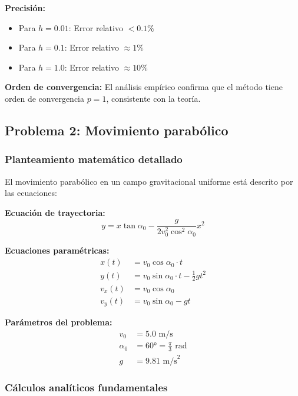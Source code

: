\documentclass{article}
\begin{document}
	\textbf{Precisión:}
	\begin{itemize}
	\item Para $h = 0.01$: Error relativo $< 0.1\%$
	\item Para $h = 0.1$: Error relativo $\approx 1\%$
	\item Para $h = 1.0$: Error relativo $\approx 10\%$
	\end{itemize}
	
	\textbf{Orden de convergencia:}
	El análisis empírico confirma que el método tiene orden de convergencia $p = 1$, consistente con la teoría.

	\clearpage

	\subsection{Problema 2: Movimiento parabólico}
	
	\subsubsection{Planteamiento matemático detallado}
	
	El movimiento parabólico en un campo gravitacional uniforme está descrito por las ecuaciones:
	
	\textbf{Ecuación de trayectoria:}
	\begin{equation}
		y = x \tan \alpha_0 - \frac{g}{2v_0^2 \cos^2 \alpha_0} x^2
		\label{eq:trayectoria}
	\end{equation}
	
	\textbf{Ecuaciones paramétricas:}
	\begin{align}
		x(t) &= v_0 \cos \alpha_0 \cdot t \\
		y(t) &= v_0 \sin \alpha_0 \cdot t - \frac{1}{2}gt^2 \\
		v_x(t) &= v_0 \cos \alpha_0 \\
		v_y(t) &= v_0 \sin \alpha_0 - gt
	\end{align}
	
	\textbf{Parámetros del problema:}
	\begin{align}
		v_0 &= 5.0 \text{ m/s} \\
		\alpha_0 &= 60° = \frac{\pi}{3} \text{ rad} \\
		g &= 9.81 \text{ m/s}^2
	\end{align}
	
	\subsubsection{Cálculos analíticos fundamentales}
	
\end{document}
